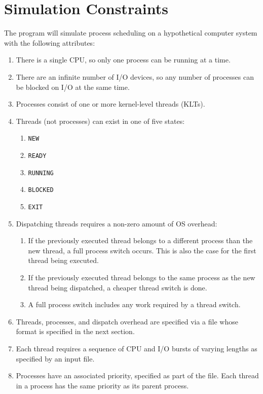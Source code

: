 \documentclass[main.tex]{subfiles}
\begin{document}
\section{Simulation Constraints}
\label{sec:sim-info}

The program will simulate process scheduling on a hypothetical computer system with the following attributes:

\begin{enumerate}
    \item There is a single CPU, so only one process can be running at a time.
    \item There are an infinite number of I/O devices, so any number of processes can be blocked on I/O at the same time.
    \item Processes consist of one or more kernel-level threads (KLTs).
    \item Threads (not processes) can exist in one of five states:
    \begin{enumerate}
        \item \texttt{NEW}
        \item \texttt{READY}
        \item \texttt{RUNNING}
        \item \texttt{BLOCKED}
        \item \texttt{EXIT}
    \end{enumerate}
    \item Dispatching threads requires a non-zero amount of OS overhead:
    \begin{enumerate}
        \item If the previously executed thread belongs to a different process than the new thread, a full process switch occurs. This is also the case for the first thread being executed.
        \item If the previously executed thread belongs to the same process as the new thread being dispatched, a cheaper thread switch is done.
        \item A full process switch includes any work required by a thread switch.
    \end{enumerate}
    \item Threads, processes, and dispatch overhead are specified via a file whose format is specified in the next section.
    \item Each thread requires a sequence of CPU and I/O bursts of varying lengths as specified by an input file.
    \item Processes have an associated priority, specified as part of the file. Each thread in a process has the same priority as its parent process.

\end{enumerate}
\end{document}
